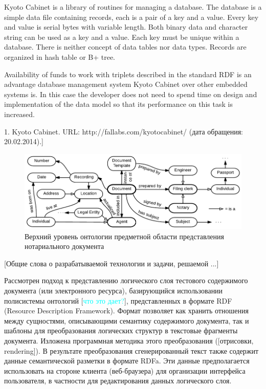 \documentclass[utf8]{../IncArticle}
\newcommand{\e}[2][fcolor]{\textcolor{pcolor}{[}\textcolor{#1}{#2}\textcolor{pcolor}{]}}
\begin{document}
Kyoto Cabinet is a library of routines for managing a database.  The database is a simple data file containing records, each is a pair of a key and a value.  Every key and value is serial bytes with variable length.  Both binary data and character string can be used as a key and a value.  Each key must be unique within a database.  There is neither concept of data tables nor data types.  Records are organized in hash table or B+ tree.  \cite{b1}

Availability of funds to work with triplets described in the standard RDF is an advantage database management system Kyoto Cabinet over other embedded systems is.  In this case the developer does not need to spend time on design and implementation of the data model so that its performance on this task is increased.

1.	Kyoto Cabinet. URL: http://fallabs.com/kyotocabinet/ (дата обращения: 20.02.2014).]

\begin{figure}[!t]
\centering
\includegraphics[width=\linewidth]{DocumentOntology-en.pdf}
\caption{Верхний уровень онтологии предметной области представления
  нотариального документа}
\label{notaryontology}
\end{figure}


\conclusion

\e{Общие слова о разрабатываемой технологии и задачи, решаемой ...}

Рассмотрен подход к представлению логического слоя тестового
содержимого документа (или электронного ресурса), базирующийся
использовании полисистемы онтологий \e[cyan]{что это дает?}, представленных в формате RDF
(Resource Description Framework).  Формат позволяет как хранить
отношения между сущностями, описывающими семантику содержимого
документа, так и шаблоны для преобразования логических структур в
текстовые фрагменты документа.  Изложена программная методика этого преобразования
(\e{отрисовки, rendering}).  В результате преобразования
сгенерированный текст также содержит данные семантической разметки в
формате RDFa.  Эти данные предполагается использовать на стороне
клиента (веб-браузера) для организации интерфейса пользователя, в
частности для редактирования данных логического слоя.
\end{document}
